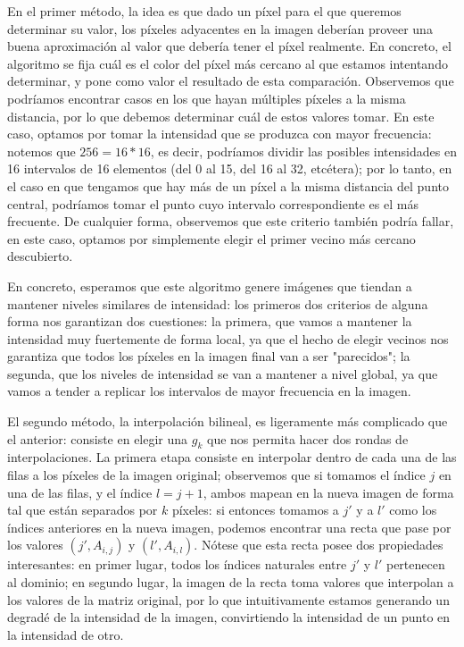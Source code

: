 \documentclass{article}
\begin{document}
En el primer método, la idea es que dado un píxel para el que queremos determinar su valor, los píxeles adyacentes en la imagen deberían proveer una buena aproximación al valor que debería tener el píxel realmente. En concreto, el algoritmo se fija cuál es el color del píxel más cercano al que estamos intentando determinar, y pone como valor el resultado de esta comparación. Observemos que podríamos encontrar casos en los que hayan múltiples píxeles a la misma distancia, por lo que debemos determinar cuál de estos valores tomar. En este caso, optamos por tomar la intensidad que se produzca con mayor frecuencia: notemos que $256 = 16 * 16$, es decir, podríamos dividir las posibles intensidades en 16 intervalos de 16 elementos (del 0 al 15, del 16 al 32, etcétera); por lo tanto, en el caso en que tengamos que hay más de un píxel a la misma distancia del punto central, podríamos tomar el punto cuyo intervalo correspondiente es el más frecuente. De cualquier forma, observemos que este criterio también podría fallar, en este caso, optamos por simplemente elegir el primer vecino más cercano descubierto.

En concreto, esperamos que este algoritmo genere imágenes que tiendan a mantener niveles similares de intensidad: los primeros dos criterios de alguna forma nos garantizan dos cuestiones: la primera, que vamos a mantener la intensidad muy fuertemente de forma local, ya que el hecho de elegir vecinos nos garantiza que todos los píxeles en la imagen final van a ser "parecidos"; la segunda, que los niveles de intensidad se van a mantener a nivel global, ya que vamos a tender a replicar los intervalos de mayor frecuencia en la imagen.

El segundo método, la interpolación bilineal, es ligeramente más complicado que el anterior: consiste en elegir una $g_k$ que nos permita hacer dos rondas de interpolaciones. La primera etapa consiste en interpolar dentro de cada una de las filas a los píxeles de la imagen original; observemos que si tomamos el índice $j$ en una de las filas, y el índice $l = j + 1$, ambos mapean en la nueva imagen de forma tal que están separados por $k$ píxeles: si entonces tomamos a $j'$ y a $l'$ como los índices anteriores en la nueva imagen, podemos encontrar una recta que pase por los valores $(j', A_{i, j})$ y $(l', A_{i, l})$. Nótese que esta recta posee dos propiedades interesantes: en primer lugar, todos los índices naturales entre $j'$ y $l'$ pertenecen al dominio; en segundo lugar, la imagen de la recta toma valores que interpolan a los valores de la matriz original, por lo que intuitivamente estamos generando un degradé de la intensidad de la imagen, convirtiendo la intensidad de un punto en la intensidad de otro. 
\end{document}
